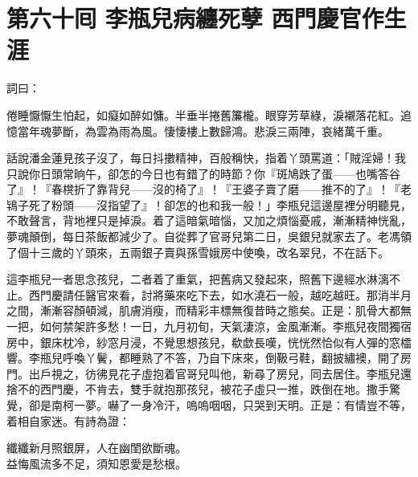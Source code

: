 
\chapter*{第六十囘 李瓶兒病纏死孽 西門慶官作生涯}


詞曰：

\begin{myquote}
倦睡懨懨生怕起，如癡如醉如慵。半垂半捲舊簾櫳。眼穿芳草綠，淚襯落花紅。追憶當年魂夢斷，為雲為雨為風。悽悽樓上數歸鴻。悲淚三兩陣，哀緒萬千重。

\end{myquote}

話說潘金蓮見孩子沒了，每日抖擻精神，百般稱快，指着丫頭罵道：「賊淫婦！我只說你日頭常晌午，卻怎的今日也有錯了的時節？你『斑鳩跌了蛋——也嘴答谷了』！『春櫈折了靠背兒——沒的椅了』！『王婆子賣了磨——推不的了』！『老鴇子死了粉頭——沒指望了』！卻怎的也和我一般！」{}李瓶兒這邊屋裡分明聽見，不敢聲言，背地裡只是掉淚。着了這暗氣暗惱，又加之煩惱憂戚，漸漸精神恍亂，夢魂顛倒，每日茶飯都減少了。自從葬了官哥兒第二日，吳銀兒就家去了。老馮領了個十三歲的丫頭來，五兩銀子賣與孫雪娥房中使喚，改名翠兒，不在話下。

這李瓶兒一者思念孩兒，二者着了重氣，把舊病又發起來，照舊下邊經水淋漓不止。西門慶請任醫官來看，討將藥來吃下去，如水澆石一般，越吃越旺。那消半月之間，漸漸容顏頓減，肌膚消瘦，而精彩丰標無復昔時之態矣。正是：肌骨大都無一把，如何禁架許多愁！一日，九月初旬，天氣淒涼，金風漸漸。李瓶兒夜間獨宿房中，銀床枕冷，紗窓月浸，不覺思想孩兒，欷歔長嘆，恍恍然恰似有人彈的窓櫺響。李瓶兒呼喚丫鬢，都睡熟了不答，乃自下床來，倒靸弓鞋，翻披繡襖，開了房門。出戶視之，彷彿見花子虛抱着官哥兒叫他，新尋了房兒，同去居住。李瓶兒還捨不的西門慶，不肯去，雙手就抱那孩兒，被花子虛只一推，跌倒在地。撒手驚覺，卻是南柯一夢。嚇了一身冷汗，嗚嗚咽咽，只哭到天明。{}正是：有情豈不等，着相自家迷。有詩為證：

\begin{myquote}
纖纖新月照銀屏，人在幽閨欲斷魂。\\益悔風流多不足，須知恩愛是愁根。
\end{myquote}

